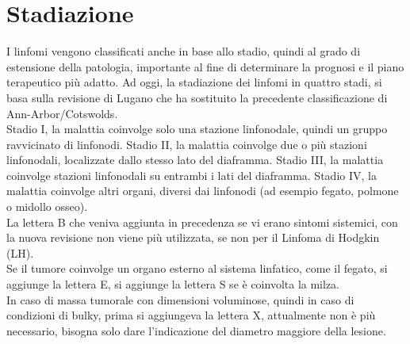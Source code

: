 \section{Stadiazione}
I linfomi vengono classificati anche in base allo stadio, quindi al grado di estensione della patologia, 
importante al fine di determinare la prognosi e il piano terapeutico più adatto. 
Ad oggi, la stadiazione dei linfomi in quattro stadi, si basa sulla revisione di Lugano che ha sostituito 
la precedente classificazione di Ann-Arbor/Cotswolds\cite{LLS}.\\
Stadio I, la malattia coinvolge solo una stazione linfonodale, quindi un gruppo ravvicinato di linfonodi. 
Stadio II, la malattia coinvolge due o più stazioni linfonodali, localizzate dallo stesso lato del diaframma. 
Stadio III, la malattia coinvolge stazioni linfonodali su entrambi i lati del diaframma. 
Stadio IV, la malattia coinvolge altri organi, diversi dai linfonodi (ad esempio fegato, polmone o midollo osseo)\cite{LLS}.\\
La lettera B che veniva aggiunta in precedenza se vi erano sintomi sistemici, con la nuova revisione non viene 
più utilizzata, se non per il Linfoma di Hodgkin (LH)\cite{AIOM}.\\
Se il tumore coinvolge un organo esterno al sistema linfatico, come il fegato, si aggiunge la lettera E, 
si aggiunge la lettera S se è coinvolta la milza.\\
In caso di massa tumorale con dimensioni voluminose, quindi in caso di condizioni di bulky, 
prima si aggiungeva la lettera X, attualmente non è più necessario, 
bisogna solo dare l’indicazione del diametro maggiore della lesione\cite{AIOM}.\\ 


